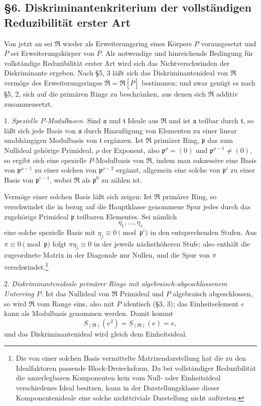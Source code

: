 \documentclass[11pt]{article}
\providecommand{\mR}{\mathfrak{R}}
\providecommand{\bR}{\overline{\mathfrak{R}}}
\providecommand{\ma}{\mathfrak{a}}
\providecommand{\mpideal}{\mathfrak{p}}
\providecommand{\mt}{\mathfrak{t}}
\providecommand{\bP}{\overline{P}}
\begin{document}
\subsection*{§6. Diskriminantenkriterium der vollständigen Reduzibilität erster Art}

Von jetzt an sei $\mR$ wieder als Erweiterungsring eines Körpers $P$ vorausgesetzt und $\bP$ sei Erweiterungskörper von $P$. Als notwendige und hinreichende Bedingung für vollständige Reduzibilität erster Art wird sich das Nichtverschwinden der Diskriminante ergeben. Nach §5, 3 läßt sich das Diskriminantenideal von $\mR$ vermöge des Erweiterungsringes $\bR=\mR[\bP]$ bestimmen; und zwar genügt es nach §5, 2, sich auf die primären Ringe zu beschränken, aus denen sich $\bR$ additiv zusammensetzt.

1. \emph{Spezielle $P$-Modulbasen.} Sind $\ma$ und $\mt$ Ideale aus $\mR$ und ist $\ma$ teilbar durch $\mt$, so läßt sich jede Basis von $\ma$ durch Hinzufügung von Elementen zu einer linear unabhängigen Modulbasis von $\mt$ ergänzen. Ist $\mR$ primärer Ring, $\mpideal$ das zum Nullideal gehörige Primideal, $\rho$ der Exponent, also $\mpideal^\rho=(0)$ und $\mpideal^{\rho-1}\ne(0)$, so ergibt sich eine spezielle $P$-Modulbasis von $\mR$, indem man sukzessive eine Basis von $\mpideal^{\rho-1}$ zu einer solchen von $\mpideal^{\rho-2}$ ergänzt, allgemein eine solche von $\mpideal^i$ zu einer Basis von $\mpideal^{i-1}$, wobei $\mR$ als $\mpideal^0$ zu zählen ist.

Vermöge einer solchen Basis läßt sich zeigen: Ist $\mR$ primärer Ring, so verschwindet die in bezug auf die Hauptklasse genommene Spur jedes durch das zugehörige Primideal $\mpideal$ teilbaren Elementes. Sei nämlich
\[
\eta_1,\ldots,\eta_s
\]
eine solche spezielle Basis mit $\eta_j\equiv0\pmod{\mpideal^i}$ in den entsprechenden Stufen. Aus $\pi\equiv0\pmod{\mpideal}$ folgt $\pi\eta_j\equiv0$ in der jeweils nächsthöheren Stufe; also enthält die zugeordnete Matrix in der Diagonale nur Nullen, und die Spur von $\pi$ verschwindet.\footnote{Die von einer solchen Basis vermittelte Matrizendarstellung hat die zu den Idealfaktoren passende Block-Dreiecksform. Da bei vollständiger Reduzibilität die unzerlegbaren Komponenten kein vom Null- oder Einheitsideal verschiedenes Ideal besitzen, kann in der Darstellungsklasse dieser Komponentenideale eine solche nichttriviale Darstellung nicht auftreten.}

2. \emph{Diskriminantenideale primärer Ringe mit algebraisch-abgeschlossenem Unterring $P$.} Ist das Nullideal von $\mR$ Primideal und $P$ algebraisch abgeschlossen, so wird $\mR$ vom Range eins, also mit $P$ identisch (§3, 3); das Einheitselement $e$ kann als Modulbasis genommen werden. Damit kommt
\[
        S_{(\mR)}(e^2)=S_{(\mR)}(e)=e,
\]
und das Diskriminantenideal wird gleich dem Einheitsideal.
\end{document}
